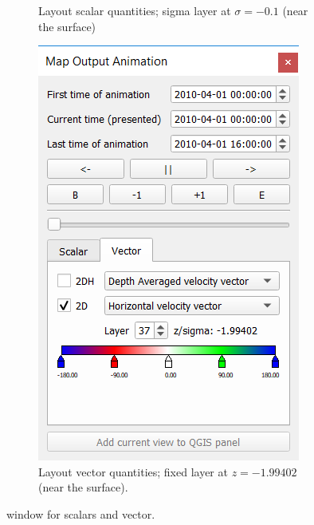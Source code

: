 \documentclass{deltares_memo}
\begin{document}
\begin{figure}[H]
\begin{subfigure}[b]{0.48\textwidth}
	\caption{Layout scalar quantities; sigma layer at $\sigma = -0.1$ (near the surface)\label{fig:map_output_a}}
\end{subfigure}
\hfill
\begin{subfigure}[b]{0.48\textwidth}
	\centering
	\includegraphics[width=\textwidth]{pictures/map_output_animation_window_vector.png}
	\caption{Layout vector quantities; fixed layer at $z = -1.99402$ (near the surface).}
\end{subfigure}
    \caption{ window for scalars and vector.}
\end{figure}
\end{document}
